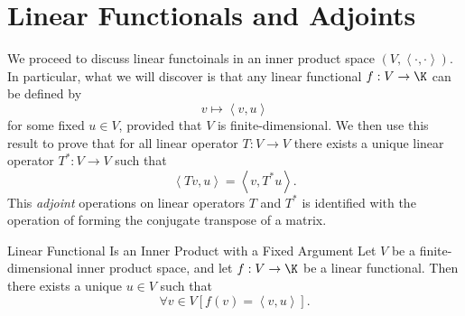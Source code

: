 \documentclass[linearalgebra]{subfiles}
\begin{document}
    \section{Linear Functionals and Adjoints}
    
    \begin{remark}
        We proceed to discuss linear functoinals in an inner product space $\left( V,\left\langle \cdot, \cdot\right\rangle  \right)$. In particular, what we will discover is that any linear functional $f:V\to\K$ can be defined by 
        \begin{equation*}
            v\mapsto \left\langle v, u\right\rangle 
        \end{equation*}
        for some fixed $u\in V$, provided that $V$ is finite-dimensional. We then use this result to prove that for all linear operator $T:V\to V$ there exists a unique linear operator $T^*:V\to V$ such that
        \begin{equation*}
            \left\langle Tv, u\right\rangle = \left\langle v, T^*u\right\rangle .
        \end{equation*}
        This \textit{adjoint} operations on linear operators $T$ and $T^*$ is identified with the operation of forming the conjugate transpose of a matrix.
    \end{remark}

    \clearpage
    \begin{theorem}{Linear Functional Is an Inner Product with a Fixed Argument}
        Let $V$ be a finite-dimensional inner product space, and let $f:V\to\K$ be a linear functional. Then there exists a unique $u\in V$ such that
        \begin{equation*}
            \forall v\in V\left[ f(v)= \left\langle v, u\right\rangle  \right] .
        \end{equation*}
    \end{theorem}
\end{document}
